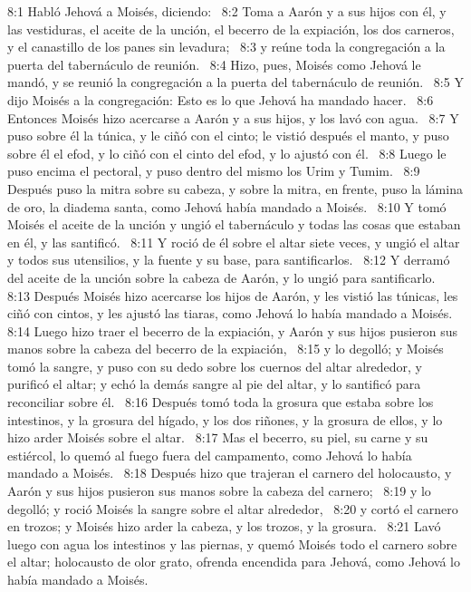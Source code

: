 8:1 Habló Jehová a Moisés, diciendo:  
8:2 Toma a Aarón y a sus hijos con él, y las vestiduras, el aceite de la unción, el becerro de la expiación, los dos carneros, y el canastillo de los panes sin levadura;  
8:3 y reúne toda la congregación a la puerta del tabernáculo de reunión.  
8:4 Hizo, pues, Moisés como Jehová le mandó, y se reunió la congregación a la puerta del tabernáculo de reunión.  
8:5 Y dijo Moisés a la congregación: Esto es lo que Jehová ha mandado hacer.  
8:6 Entonces Moisés hizo acercarse a Aarón y a sus hijos, y los lavó con agua.  
8:7 Y puso sobre él la túnica, y le ciñó con el cinto; le vistió después el manto, y puso sobre él el efod, y lo ciñó con el cinto del efod, y lo ajustó con él.  
8:8 Luego le puso encima el pectoral, y puso dentro del mismo los Urim y Tumim.  
8:9 Después puso la mitra sobre su cabeza, y sobre la mitra, en frente, puso la lámina de oro, la diadema santa, como Jehová había mandado a Moisés.  
8:10 Y tomó Moisés el aceite de la unción y ungió el tabernáculo y todas las cosas que estaban en él, y las santificó.  
8:11 Y roció de él sobre el altar siete veces, y ungió el altar y todos sus utensilios, y la fuente y su base, para santificarlos.  
8:12 Y derramó del aceite de la unción sobre la cabeza de Aarón, y lo ungió para santificarlo.  
8:13 Después Moisés hizo acercarse los hijos de Aarón, y les vistió las túnicas, les ciñó con cintos, y les ajustó las tiaras, como Jehová lo había mandado a Moisés.  
8:14 Luego hizo traer el becerro de la expiación, y Aarón y sus hijos pusieron sus manos sobre la cabeza del becerro de la expiación,  
8:15 y lo degolló; y Moisés tomó la sangre, y puso con su dedo sobre los cuernos del altar alrededor, y purificó el altar; y echó la demás sangre al pie del altar, y lo santificó para reconciliar sobre él.  
8:16 Después tomó toda la grosura que estaba sobre los intestinos, y la grosura del hígado, y los dos riñones, y la grosura de ellos, y lo hizo arder Moisés sobre el altar.  
8:17 Mas el becerro, su piel, su carne y su estiércol, lo quemó al fuego fuera del campamento, como Jehová lo había mandado a Moisés.  
8:18 Después hizo que trajeran el carnero del holocausto, y Aarón y sus hijos pusieron sus manos sobre la cabeza del carnero;  
8:19 y lo degolló; y roció Moisés la sangre sobre el altar alrededor,  
8:20 y cortó el carnero en trozos; y Moisés hizo arder la cabeza, y los trozos, y la grosura.  
8:21 Lavó luego con agua los intestinos y las piernas, y quemó Moisés todo el carnero sobre el altar; holocausto de olor grato, ofrenda encendida para Jehová, como Jehová lo había mandado a Moisés.  
